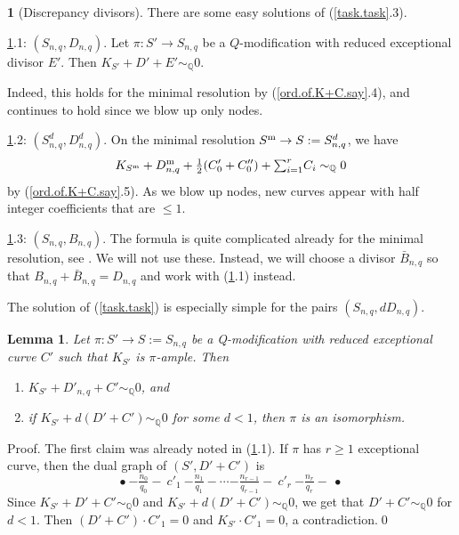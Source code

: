 \documentclass{amsart}
\newtheorem{lem}[thm]{Lemma}
\theoremstyle{definition}
\newtheorem{say}[thm]{}
\theoremstyle{remark}
\newcommand{\q}[0]{{\mathbb Q}}
\newcommand{\simq}[0]{\sim_{\q}}
\newcommand{\tsum}[0]{\textstyle{\sum}}
\begin{document}
\begin{say}[Discrepancy divisors] \label{P.mod.P.mod.c.lem}
  There are some easy  solutions of (\ref{task.task}.3).

  \ref{P.mod.P.mod.c.lem}.1: $(S_{n,q}, D_{n,q})$.    Let $\pi:S'\to S_{n,q}$ be a $Q$-modification
  with reduced exceptional divisor $E'$. Then
  $K_{S'}+D'+E'\simq 0$.

  Indeed, this holds for the minimal resolution by (\ref{ord.of.K+C.say}.4), and continues to hold  since we blow up only nodes.

  \ref{P.mod.P.mod.c.lem}.2:  $(S^d_{n,q}, D^d_{n,q})$.
  On the minimal resolution $S^{\rm m}\to S:=S^d_{n,q}$, we have
  $$
  K_{S^{\rm m}}+D^{\rm m}_{n,q}+ \tfrac12(C'_0+C''_0)+\tsum _{i=1}^r C_i\simq 0
  $$
  by (\ref{ord.of.K+C.say}.5).
  As we blow up nodes, new curves appear with  half integer coefficients that are
  $\leq 1$.

  \ref{P.mod.P.mod.c.lem}.3: $(S_{n,q}, B_{n,q})$.  The formula is quite complicated already for the minimal resolution, see \cite[3.32--34]{kk-singbook}.
  We will not use these. Instead, we will choose a divisor  $\bar B_{n,q}$ so that $B_{n,q}+ \bar B_{n,q}=D_{n,q}$ and work with (\ref{P.mod.P.mod.c.lem}.1) instead.
\end{say}



The solution of  (\ref{task.task}) is especially simple for the pairs  $(S_{n,q}, dD_{n,q})$.

\begin{lem} \label{Dnq.triv.lem} Let $\pi:S'\to S:=S_{n,q}$ be a Q-modification
  with reduced exceptional curve $C'$ such that
  $K_{S'}$ is $\pi$-ample. Then
  \begin{enumerate}
  \item $K_{S'}+D'_{n,q}+C'\simq 0$, and
  \item if  $K_{S'}+d(D'+C')\simq 0$ for some $d<1$, then $\pi$ is an isomorphism.
    \end{enumerate}
\end{lem}

  Proof. The first claim was already noted in  (\ref{P.mod.P.mod.c.lem}.1).
  If $\pi$ has  $r\geq 1$ exceptional curve, then the  dual graph of $(S', D'+C')$ is
$$
   \bullet \ {-\boxed{\tfrac{n_0}{q_0}}-} \  c'_1 \  {-\boxed{\tfrac{n_1}{q_1}}-} \cdots  {-\boxed{\tfrac{n_{r-1}}{q_{r-1}}}-} \  c'_r \ {-\boxed{\tfrac{n_r}{q_r}}-} \ \bullet
   $$
   Since  $K_{S'}+D'+C'\simq 0$ and $K_{S'}+d(D'+C')\simq 0$, we get
   that $D'+C'\simq 0$ for  $d<1$. Then 
   $(D'+C')\cdot C'_1=0$ and  $K_{S'}\cdot C'_1=0$, a contradiction.\qed
\end{document}
